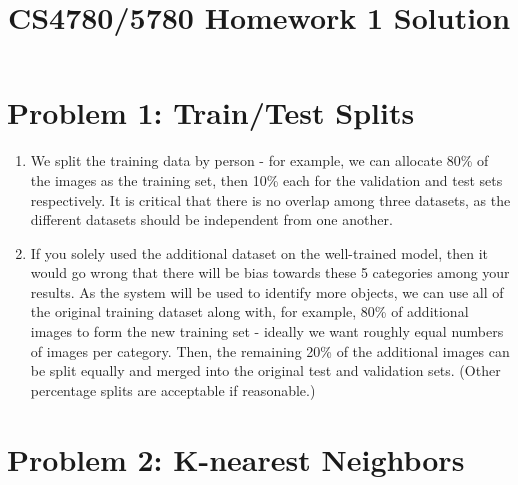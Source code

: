\documentclass[11pt]{article}
\title{CS4780/5780 Homework 1 Solution}
\author{}
\date{}
\begin{document}
    \maketitle

    \section*{Problem 1: Train/Test Splits}

    \begin{enumerate}

        \item We split the training data by person - for example, we can allocate 80\% of the images as the training set, then 10\% each for the validation and test sets respectively. It is critical that there is no overlap among three datasets, as the different datasets should be independent from one another.

        \item If you solely used the additional dataset on the well-trained model, then it would go wrong that there will be bias towards these 5 categories among your results. As the system will be used to identify more objects, we can use all of the original training dataset along with, for example, 80\% of additional images to form the new training set - ideally we want roughly equal numbers of images per category. Then, the remaining 20\% of the additional images can be split equally and merged into the original test and validation sets. (Other percentage splits are acceptable if reasonable.)

    \end{enumerate}
    \section*{Problem 2: K-nearest Neighbors}
\end{document}
